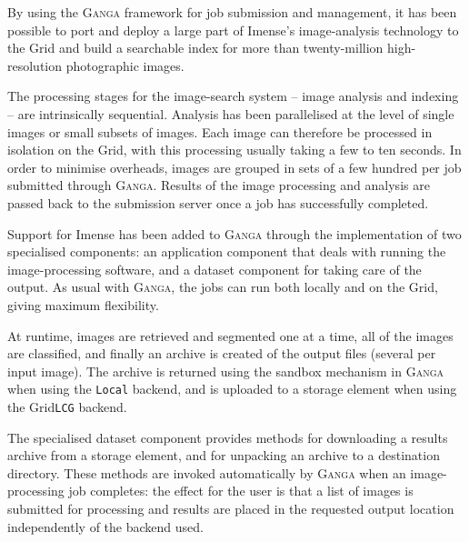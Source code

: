 \documentclass{elsart}
\def\ganga {\textsc{Ganga}\xspace}
\def\grid {Grid\xspace}
\newcommand{\code}[1]{\texttt{#1}}
\begin{document}
\begin{linenumbers}
By using the \ganga framework for job submission and management, it has been
possible to port and deploy a large part of Imense's image-analysis technology
to the \grid and build a searchable index for more than
twenty-million high-resolution photographic images.

The processing stages for the image-search system -- image analysis
and indexing -- are intrinsically sequential.  Analysis has been parallelised
at the level of single
images or small subsets of images. Each image can therefore be processed in
isolation on the \grid, with this processing usually taking a few to ten
seconds.  In order to minimise overheads, images are grouped in sets of
a few hundred per job submitted through \ganga.  Results of the image
processing and analysis are passed back to the submission server once a
job has successfully completed.

Support for Imense has been added to \ganga through the implementation of two
specialised components: an application component that deals with running the
image-processing software, and a dataset component for taking care of
the output. As usual with \ganga, the jobs can run both locally and on the
\grid, giving maximum flexibility.

At runtime, images are retrieved and segmented one at a time, all of the
images are classified, and finally an archive is created of the output files
(several per input image).  The archive is returned using the sandbox
mechanism in \ganga when using the \code{Local} backend, and is uploaded to a
storage element when using the \grid \code{LCG} backend.

The specialised dataset component provides methods for downloading a results
archive from a storage element, and for unpacking an archive to a destination
directory. These methods are invoked automatically by \ganga when an
image-processing job completes: the effect for the user is that a list of
images is submitted for processing and results are placed in the requested
output location independently of the backend used.


\end{linenumbers}
\end{document}
